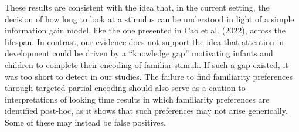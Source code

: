 \documentclass[10pt, letterpaper]{article}
\begin{document}
These results are consistent with the idea that, in the current setting,
the decision of how long to look at a stimulus can be understood in
light of a simple information gain model, like the one presented in Cao
et al. (2022), across the lifespan. In contrast, our evidence does not
support the idea that attention in development could be driven by a
``knowledge gap'' motivating infants and children to complete their
encoding of familiar stimuli. If such a gap existed, it was too short to
detect in our studies. The failure to find familiarity preferences
through targeted partial encoding should also serve as a caution to
interpretations of looking time results in which familiarity preferences
are identified post-hoc, as it shows that such preferences may not arise
generically. Some of these may instead be false positives.
\end{document}
